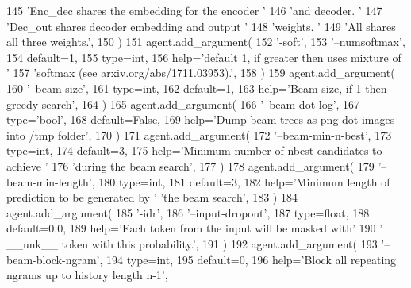 \begin{DoxyCode}
145             \textcolor{stringliteral}{'Enc\_dec shares the embedding for the encoder '}
146             \textcolor{stringliteral}{'and decoder. '}
147             \textcolor{stringliteral}{'Dec\_out shares decoder embedding and output '}
148             \textcolor{stringliteral}{'weights. '}
149             \textcolor{stringliteral}{'All shares all three weights.'},
150         )
151         agent.add\_argument(
152             \textcolor{stringliteral}{'-soft'},
153             \textcolor{stringliteral}{'--numsoftmax'},
154             default=1,
155             type=int,
156             help=\textcolor{stringliteral}{'default 1, if greater then uses mixture of '}
157             \textcolor{stringliteral}{'softmax (see arxiv.org/abs/1711.03953).'},
158         )
159         agent.add\_argument(
160             \textcolor{stringliteral}{'--beam-size'},
161             type=int,
162             default=1,
163             help=\textcolor{stringliteral}{'Beam size, if 1 then greedy search'},
164         )
165         agent.add\_argument(
166             \textcolor{stringliteral}{'--beam-dot-log'},
167             type=\textcolor{stringliteral}{'bool'},
168             default=\textcolor{keyword}{False},
169             help=\textcolor{stringliteral}{'Dump beam trees as png dot images into /tmp folder'},
170         )
171         agent.add\_argument(
172             \textcolor{stringliteral}{'--beam-min-n-best'},
173             type=int,
174             default=3,
175             help=\textcolor{stringliteral}{'Minimum number of nbest candidates to achieve '}
176             \textcolor{stringliteral}{'during the beam search'},
177         )
178         agent.add\_argument(
179             \textcolor{stringliteral}{'--beam-min-length'},
180             type=int,
181             default=3,
182             help=\textcolor{stringliteral}{'Minimum length of prediction to be generated by '} \textcolor{stringliteral}{'the beam search'},
183         )
184         agent.add\_argument(
185             \textcolor{stringliteral}{'-idr'},
186             \textcolor{stringliteral}{'--input-dropout'},
187             type=float,
188             default=0.0,
189             help=\textcolor{stringliteral}{'Each token from the input will be masked with'}
190             \textcolor{stringliteral}{' \_\_unk\_\_ token with this probability.'},
191         )
192         agent.add\_argument(
193             \textcolor{stringliteral}{'--beam-block-ngram'},
194             type=int,
195             default=0,
196             help=\textcolor{stringliteral}{'Block all repeating ngrams up to history length n-1'},

\end{DoxyCode}
